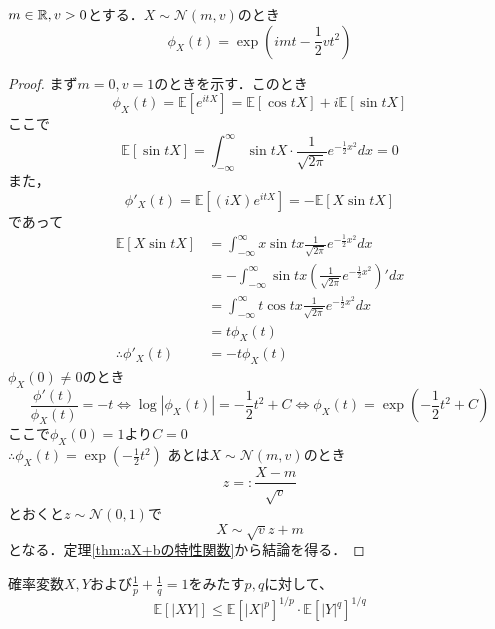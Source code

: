 \documentclass[dvipdfmx, leqno]{jsbook}
\begin{document}
    $m\in \mathbb{R}, v> 0$とする．$X\sim \mathcal{N}(m, v)$のとき
\begin{equation}
    \phi_X(t)= \exp{\left(imt- \frac{1}{2}vt^2\right)}
\end{equation}
\begin{proof}
    まず$m= 0, v= 1$のときを示す．このとき
\begin{equation}
    \phi_X(t)= \mathbb{E}[e^{itX}]= \mathbb{E}[\cos{tX}]+ i\mathbb{E}[\sin{tX}]
\end{equation}
    ここで
\begin{equation}
    \mathbb{E}[\sin{tX}]= \int_{-\infty}^\infty \sin{tX}\cdot \frac{1}{\sqrt{2\pi}}e^{-\frac{1}{2}x^2}dx= 0
\end{equation}
    また，
\begin{equation}
    \phi'_X(t)= \mathbb{E}[(iX)e^{itX}]= -\mathbb{E}[X\sin{tX}]
\end{equation}
    であって
\begin{align}
    \mathbb{E}[X\sin{tX}]
    &= \int_{-\infty}^\infty x\sin{tx}\frac{1}{\sqrt{2\pi}}e^{-\frac{1}{2}x^2}dx\\
    &= -\int_{-\infty}^\infty \sin{tx}\left(\frac{1}{\sqrt{2\pi}}e^{-\frac{1}{2}x^2}\right)'dx\\
    &= \int_{-\infty}^\infty t\cos{tx}\frac{1}{\sqrt{2\pi}}e^{-\frac{1}{2}x^2}dx\\
    &= t\phi_X(t)\\
    \therefore \phi'_X(t)&= -t\phi_X(t)
\end{align}
    $\phi_X(0)\ne 0$のとき
\begin{equation}
    \frac{\phi'(t)}{\phi_X(t)}= -t
    \iff \log|\phi_X(t)|= -\frac{1}{2}t^2+ C
    \iff \phi_X(t)= \exp{\left(-\frac{1}{2}t^2+ C\right)}
\end{equation}
    ここで$\phi_X(0)= 1$より$C= 0$\\
    $\therefore \phi_X(t)= \exp{\left(-\frac{1}{2}t^2\right)}$
    あとは$X\sim \mathcal{N}(m, v)$のとき
\begin{equation}
    z=: \frac{X- m}{\sqrt{v}}
\end{equation}
    とおくと$z\sim \mathcal{N}(0, 1)$で
\begin{equation}
    X\sim \sqrt{v}z+ m
\end{equation}
    となる．定理\ref{thm:aX+bの特性関数}から結論を得る．
\end{proof}

    確率変数$X, Y$および$\frac{1}{p}+ \frac{1}{q}= 1$をみたす$p, q$に対して、
\begin{equation}
    \mathbb{E}[|XY|]\le \mathbb{E}[|X|^p]^{1/p}\cdot \mathbb{E}[|Y|^q]^{1/q}
\end{equation}
\end{document}
